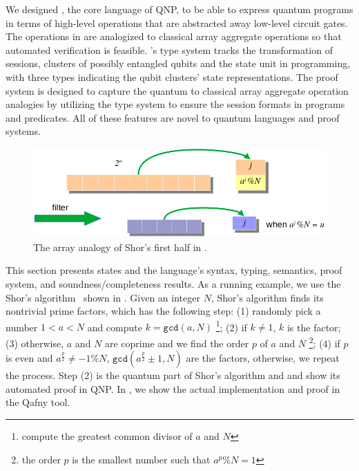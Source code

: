 We designed \qafny, the core language of QNP,
to be able to express quantum programs in terms of
high-level operations that are abstracted away low-level circuit gates.
The operations in \qafny are analogized to classical array 
aggregate operations so that automated verification is feasible.
\qafny's type system tracks the transformation of sessions, 
clusters of possibly entangled qubits and the state unit in \qafny programming,
with three types indicating the qubit clusters' state representations.
The \qafny proof system is designed to capture the quantum to classical array aggregate operation analogies
by utilizing the type system to ensure the session formats in programs and predicates.
All of these features are novel to quantum languages and proof systems. 

\begin{figure}
  \includegraphics[width=.60\textwidth]{shorsmap}
  \caption{The array analogy of Shor's first half in . }
\label{fig:shorsanalog}
\end{figure}

This section presents \qafny states and the language's syntax, typing, 
semantics, proof system, and soundness/completeness results.  
As a running example, we use the Shor's algorithm~\cite{Shor94} shown in . 
Given an integer $N$, Shor's algorithm finds its nontrivial prime factors, which has the following step: (1) randomly pick a number $1 < a < N$ and compute $k=\texttt{gcd}(a,N)$ \footnote{compute the greatest common divisor of $a$ and $N$}; (2) if $k \neq 1$, $k$ is the factor; (3) otherwise, $a$ and $N$ are coprime and we find the order $p$ of $a$ and $N$ \footnote{the order $p$ is the smallest number such that $a^p \% N = 1$}; (4) if $p$ is even and $a^{\frac{p}{2}} \neq -1 \% N$, $\texttt{gcd}(a^{\frac{p}{2}}\pm 1,N)$ are the factors, otherwise, we repeat the process. Step (2) is the quantum part of Shor's algorithm and  and  show its automated proof in QNP. In , we show the actual implementation and proof in the Qafny tool.

